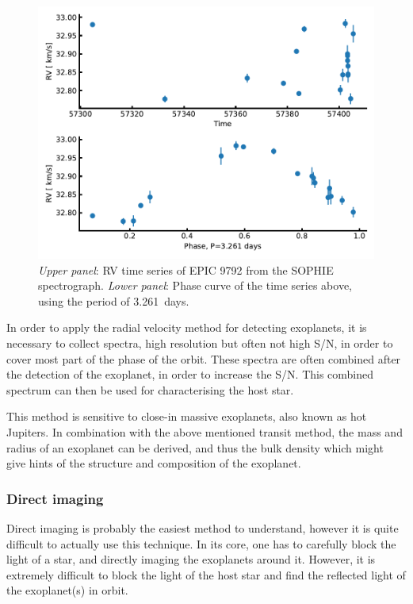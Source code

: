\begin{figure}[htpb!]
    \centering
    \includegraphics[width=1.0\linewidth]{figures/RVmethod.pdf}
    \caption{\emph{Upper panel}: RV time series of EPIC 9792 from the SOPHIE spectrograph.
             \emph{Lower panel}: Phase curve of the time series above, using the period of
             \SI{3.261}{days}.}
    \label{fig:rvmethod}
\end{figure}

In order to apply the radial velocity method for detecting exoplanets, it is necessary to collect
spectra, high resolution but often not high S/N, in order to cover most part of the phase of the
orbit. These spectra are often combined after the detection of the exoplanet, in order to increase
the S/N. This combined spectrum can then be used for characterising the host star.

This method is sensitive to close-in massive exoplanets, also known as hot Jupiters. In combination
with the above mentioned transit method, the mass and radius of an exoplanet can be derived, and
thus the bulk density which might give hints of the structure and composition of the exoplanet.


\subsubsection{Direct imaging}

Direct imaging is probably the easiest method to understand, however it is quite difficult to
actually use this technique. In its core, one has to carefully block the light of a star, and
directly imaging the exoplanets around it. However, it is extremely difficult to block the light of
the host star and find the reflected light of the exoplanet(s) in orbit.

